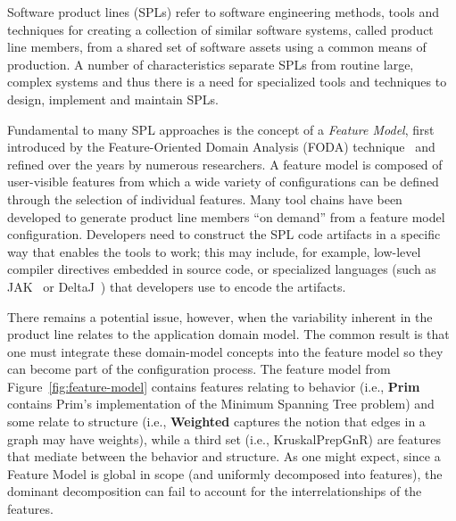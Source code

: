 
Software product lines (SPLs) refer to software engineering methods,
tools and techniques for creating a collection of similar software
systems, called product line members, from a shared set of software
assets using a common means of production. A number of characteristics
separate SPLs from routine large, complex systems and thus there is a need for specialized tools and techniques to design, implement and maintain SPLs. 

Fundamental to many SPL approaches is the concept of a \textit{Feature
Model}, first introduced by the Feature-Oriented Domain Analysis (FODA)
technique~\cite{Kang1990} and refined over the years by numerous
researchers. A feature model is composed of user-visible features from
which a wide variety of configurations can be defined through the
selection of individual features. Many tool chains have been developed
to generate product line members ``on demand'' from a feature model
configuration. Developers need to construct the SPL code artifacts in a
specific way that enables the tools to work; this may include, for
example, low-level compiler directives embedded in source code, or
specialized languages (such as JAK~\cite{Batory2004FeatureorientedPA} or
DeltaJ~\cite{Schaefer:2010:DPS:1885639.1885647}) that developers use to
encode the artifacts.


There remains a potential issue, however, when the variability inherent
in the product line relates to the application domain model. The common
result is that one must integrate these domain-model concepts into the
feature model so they can become part of the configuration process. The
feature model from Figure~\ref{fig:feature-model} contains features
relating to behavior (i.e., \textbf{Prim} contains Prim's implementation
of the Minimum Spanning Tree problem) and some relate to structure
(i.e., \textbf{Weighted} captures the notion that edges in a graph may
have weights), while a third set (i.e., KruskalPrepGnR) are features
that mediate between the behavior and structure. As one might expect,
since a Feature Model is global in scope (and uniformly decomposed into
features), the dominant decomposition can fail to account for the
interrelationships of the features.


